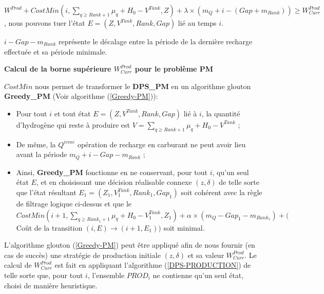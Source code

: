 $W^{Prod} + CostMin(i, \sum_{q \geq Rank +1} \mu_q + H_0- V^{Tank}, Z) +\lambda \times (m_Q + i - (Gap + m_{Rank}) ) \geq W^{Prod}_{Curr}$, 
nous pouvons tuer l'état $E = (Z, V^{Tank} , Rank, Gap)$ lié au temps $i$.

\begin{Rem}
	$i - Gap - m_{Rank}$ représente le décalage entre la période de la dernière recharge effectuée et sa période minimale.
\end{Rem}

\textbf{Calcul de la borne supérieure $W^{Prod}_{Curr}$ pour le problème \textbf{PM}}

$CostMin$ nous permet de transformer le \textbf{DPS\_PM} en un algorithme glouton \textbf{Greedy\_PM} (Voir algorithme (\ref{Greedy-PM})):
\begin{itemize}
	
	\item Pour tout $i$ et tout état $E = (Z, V^{Tank} , Rank, Gap)$ lié à $i$, la quantité d'hydrogène qui reste à produire est $V = \sum_{q \geq Rank +1}\mu_q + H_0 - V^{Tank}$ ; 
	\item De même, la $Q^{ieme}$ opération de recharge en carburant ne peut avoir lieu avant la période $m_Q + i - Gap- m_{Rank}$ ;
	\item Ainsi, \textbf{Greedy\_PM} fonctionne en ne conservant, pour tout $i$, qu'un seul état $E$, et en choisissant une décision réalisable connexe $(z, \delta)$ de telle sorte que l'état résultant $E_1 = (Z_1, V^{Tank}_1, Rank_1, Gap_1)$ soit cohérent avec la règle de filtrage logique ci-dessus et que le $CostMin(i+1, \sum_{q \geq Rank_1+1}\mu_q + H_0 - V^{Tank}_1, Z_1) +\alpha \times (m_Q - Gap_1- m_{Rank_1}) + ($Coût de la transition $(i, E)\rightarrow (i+1, E_1))$ soit minimal. 
	
\end{itemize} 
L'algorithme glouton (\ref{Greedy-PM}) peut être appliqué afin de nous fournir (en cas de succès) une stratégie de production initiale $(z,\delta )$ et sa valeur $W^{Prod}_{Curr}$. 
Le calcul de $W^{Prod}_{Curr}$ est fait en appliquant l'algorithme (\ref{DPS-PRODUCTION}) de telle sorte que, pour tout $i$, l'ensemble $PROD_i$ ne contienne qu'un seul état, choisi de manière heuristique.

